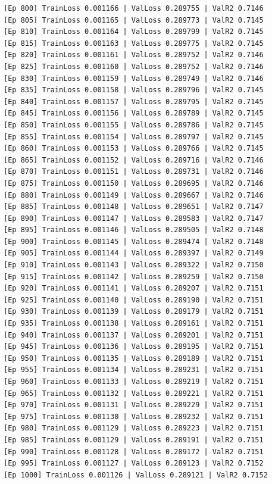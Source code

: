\documentclass[a4paper, 12pt]{article}
\begin{document}
\begin{lstlisting}
[Ep 800] TrainLoss 0.001166 | ValLoss 0.289755 | ValR2 0.7146
[Ep 805] TrainLoss 0.001165 | ValLoss 0.289773 | ValR2 0.7145
[Ep 810] TrainLoss 0.001164 | ValLoss 0.289799 | ValR2 0.7145
[Ep 815] TrainLoss 0.001163 | ValLoss 0.289775 | ValR2 0.7145
[Ep 820] TrainLoss 0.001161 | ValLoss 0.289752 | ValR2 0.7146
[Ep 825] TrainLoss 0.001160 | ValLoss 0.289752 | ValR2 0.7146
[Ep 830] TrainLoss 0.001159 | ValLoss 0.289749 | ValR2 0.7146
[Ep 835] TrainLoss 0.001158 | ValLoss 0.289796 | ValR2 0.7145
[Ep 840] TrainLoss 0.001157 | ValLoss 0.289795 | ValR2 0.7145
[Ep 845] TrainLoss 0.001156 | ValLoss 0.289789 | ValR2 0.7145
[Ep 850] TrainLoss 0.001155 | ValLoss 0.289786 | ValR2 0.7145
[Ep 855] TrainLoss 0.001154 | ValLoss 0.289797 | ValR2 0.7145
[Ep 860] TrainLoss 0.001153 | ValLoss 0.289766 | ValR2 0.7145
[Ep 865] TrainLoss 0.001152 | ValLoss 0.289716 | ValR2 0.7146
[Ep 870] TrainLoss 0.001151 | ValLoss 0.289731 | ValR2 0.7146
[Ep 875] TrainLoss 0.001150 | ValLoss 0.289695 | ValR2 0.7146
[Ep 880] TrainLoss 0.001149 | ValLoss 0.289667 | ValR2 0.7146
[Ep 885] TrainLoss 0.001148 | ValLoss 0.289651 | ValR2 0.7147
[Ep 890] TrainLoss 0.001147 | ValLoss 0.289583 | ValR2 0.7147
[Ep 895] TrainLoss 0.001146 | ValLoss 0.289505 | ValR2 0.7148
[Ep 900] TrainLoss 0.001145 | ValLoss 0.289474 | ValR2 0.7148
[Ep 905] TrainLoss 0.001144 | ValLoss 0.289397 | ValR2 0.7149
[Ep 910] TrainLoss 0.001143 | ValLoss 0.289322 | ValR2 0.7150
[Ep 915] TrainLoss 0.001142 | ValLoss 0.289259 | ValR2 0.7150
[Ep 920] TrainLoss 0.001141 | ValLoss 0.289207 | ValR2 0.7151
[Ep 925] TrainLoss 0.001140 | ValLoss 0.289190 | ValR2 0.7151
[Ep 930] TrainLoss 0.001139 | ValLoss 0.289179 | ValR2 0.7151
[Ep 935] TrainLoss 0.001138 | ValLoss 0.289161 | ValR2 0.7151
[Ep 940] TrainLoss 0.001137 | ValLoss 0.289201 | ValR2 0.7151
[Ep 945] TrainLoss 0.001136 | ValLoss 0.289195 | ValR2 0.7151
[Ep 950] TrainLoss 0.001135 | ValLoss 0.289189 | ValR2 0.7151
[Ep 955] TrainLoss 0.001134 | ValLoss 0.289231 | ValR2 0.7151
[Ep 960] TrainLoss 0.001133 | ValLoss 0.289219 | ValR2 0.7151
[Ep 965] TrainLoss 0.001132 | ValLoss 0.289221 | ValR2 0.7151
[Ep 970] TrainLoss 0.001131 | ValLoss 0.289229 | ValR2 0.7151
[Ep 975] TrainLoss 0.001130 | ValLoss 0.289232 | ValR2 0.7151
[Ep 980] TrainLoss 0.001129 | ValLoss 0.289223 | ValR2 0.7151
[Ep 985] TrainLoss 0.001129 | ValLoss 0.289191 | ValR2 0.7151
[Ep 990] TrainLoss 0.001128 | ValLoss 0.289172 | ValR2 0.7151
[Ep 995] TrainLoss 0.001127 | ValLoss 0.289123 | ValR2 0.7152
[Ep 1000] TrainLoss 0.001126 | ValLoss 0.289121 | ValR2 0.7152
\end{lstlisting}	
	
\end{document}
